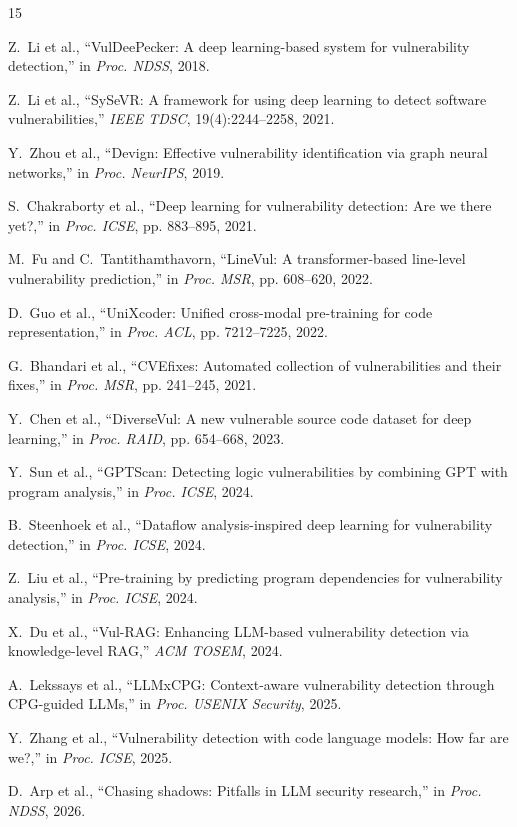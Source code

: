 \documentclass[10pt,twocolumn]{article}
\begin{document}
\small
\begin{thebibliography}{15}
\setlength{\itemsep}{0.5pt}
\setlength{\parskip}{0pt}

Z.~Li et al., ``VulDeePecker: A deep learning-based system for vulnerability detection,'' in \emph{Proc. NDSS}, 2018.

Z.~Li et al., ``SySeVR: A framework for using deep learning to detect software vulnerabilities,'' \emph{IEEE TDSC}, 19(4):2244--2258, 2021.

Y.~Zhou et al., ``Devign: Effective vulnerability identification via graph neural networks,'' in \emph{Proc. NeurIPS}, 2019.

S.~Chakraborty et al., ``Deep learning for vulnerability detection: Are we there yet?,'' in \emph{Proc. ICSE}, pp. 883--895, 2021.

M.~Fu and C.~Tantithamthavorn, ``LineVul: A transformer-based line-level vulnerability prediction,'' in \emph{Proc. MSR}, pp. 608--620, 2022.

D.~Guo et al., ``UniXcoder: Unified cross-modal pre-training for code representation,'' in \emph{Proc. ACL}, pp. 7212--7225, 2022.

G.~Bhandari et al., ``CVEfixes: Automated collection of vulnerabilities and their fixes,'' in \emph{Proc. MSR}, pp. 241--245, 2021.

Y.~Chen et al., ``DiverseVul: A new vulnerable source code dataset for deep learning,'' in \emph{Proc. RAID}, pp. 654--668, 2023.

Y.~Sun et al., ``GPTScan: Detecting logic vulnerabilities by combining GPT with program analysis,'' in \emph{Proc. ICSE}, 2024.

B.~Steenhoek et al., ``Dataflow analysis-inspired deep learning for vulnerability detection,'' in \emph{Proc. ICSE}, 2024.

Z.~Liu et al., ``Pre-training by predicting program dependencies for vulnerability analysis,'' in \emph{Proc. ICSE}, 2024.

X.~Du et al., ``Vul-RAG: Enhancing LLM-based vulnerability detection via knowledge-level RAG,'' \emph{ACM TOSEM}, 2024.

A.~Lekssays et al., ``LLMxCPG: Context-aware vulnerability detection through CPG-guided LLMs,'' in \emph{Proc. USENIX Security}, 2025.

Y.~Zhang et al., ``Vulnerability detection with code language models: How far are we?,'' in \emph{Proc. ICSE}, 2025.

D.~Arp et al., ``Chasing shadows: Pitfalls in LLM security research,'' in \emph{Proc. NDSS}, 2026.

\end{thebibliography}
\end{document}

